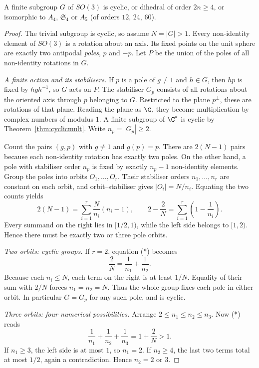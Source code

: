 \begin{theorem}\label{thm:finiteso3}
A finite subgroup $G$ of $SO(3)$ is cyclic, or dihedral of order $2n\ge4$, or isomorphic to $A_4$, $\mathfrak S_4$ or $A_5$ (of orders $12$, $24$, $60$).
\end{theorem}
\begin{proof}
The trivial subgroup is cyclic, so assume
$N=|G|>1$. Every non-identity element of
$SO(3)$ is a rotation about an axis. Its
fixed points on the unit sphere are exactly
two antipodal \emph{poles}, $p$ and $-p$.
Let $P$ be the union of the poles of all
non-identity rotations in $G$.

\emph{A finite action and its stabilisers.}
If $p$ is a pole of $g\ne1$ and $h\in G$,
then $hp$ is fixed by $hgh^{-1}$, so
$G$ acts on $P$. The stabiliser $G_p$
consists of all rotations about the oriented
axis through $p$ belonging to $G$.
Restricted to the plane $p^\perp$, these
are rotations of that plane. Reading the plane as $\C$, they become multiplication by complex numbers of modulus $1$. A finite subgroup of $\C^*$ is cyclic by Theorem~\ref{thm:cyclicmult}. Write
$n_p=|G_p|\ge2$.

Count the pairs $(g,p)$ with $g\ne1$
and $g(p)=p$. There are $2(N-1)$ pairs
because each non-identity rotation has
exactly two poles. On the other hand,
a pole with stabiliser order $n_p$ is
fixed by exactly $n_p-1$ non-identity
elements. Group the poles into orbits
$O_1,\ldots,O_r$. Their stabiliser
orders $n_1,\ldots,n_r$ are constant
on each orbit, and orbit--stabiliser
gives $|O_i|=N/n_i$. Equating the
two counts yields
\[
2(N-1)=\sum_{i=1}^r\frac{N}{n_i}(n_i-1),
\qquad
2-\frac2N=\sum_{i=1}^r
       \left(1-\frac1{n_i}\right). \tag{*}
\]
Every summand on the right lies in
$[1/2,1)$, while the left side belongs
to $[1,2)$. Hence there must be
exactly two or three pole orbits.

\emph{Two orbits: cyclic groups.}
If $r=2$, equation (*) becomes
\[
\frac2N=\frac1{n_1}+\frac1{n_2}.
\]
Because each $n_i\le N$, each term
on the right is at least $1/N$.
Equality of their sum with $2/N$
forces $n_1=n_2=N$. Thus the
whole group fixes each pole in
either orbit. In particular $G=G_p$
for any such pole, and is cyclic.

\emph{Three orbits: four numerical possibilities.}
Arrange $2\le n_1\le n_2\le n_3$.
Now (*) reads
\[
\frac1{n_1}+\frac1{n_2}+\frac1{n_3}
=1+\frac2N>1.
\]
If $n_1\ge3$, the left side is at
most $1$, so $n_1=2$.
If $n_2\ge4$, the last two
terms total at most $1/2$, again
a contradiction. Hence $n_2=2$
or $3$.


\end{proof}
